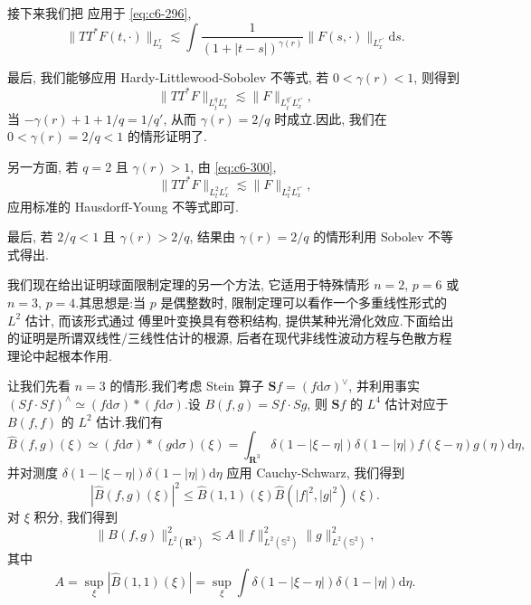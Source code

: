 接下来我们把 应用于 \eqref{eq:c6-296},
\begin{equation}
\|TT^* F(t, \cdot)\|_{L^r_x} \lesssim \int \frac{1}{(1 + |t-s|)^{\gamma(r)}} \|F(s, \cdot)\|_{L^{r'}_x} \mathrm{d}s.\label{eq:c6-300}
\end{equation}

最后, 我们能够应用 Hardy-Littlewood-Sobolev 不等式, 若 $0 < \gamma(r) < 1$, 则得到
\[
\|TT^* F\|_{L^q_t L^r_x} \lesssim \|F\|_{L^{q'}_t L^{r'}_x},
\]
当 $-\gamma(r) + 1 + 1/q = 1/q'$, 从而 $\gamma(r) = 2/q$ 时成立.因此, 我们在 $0 < \gamma(r) = 2/q < 1$ 的情形证明了.

另一方面, 若 $q = 2$ 且 $\gamma(r) > 1$, 由 \eqref{eq:c6-300},
\[
\|TT^* F\|_{L^2_t L^r_x} \lesssim \|F\|_{L^2_t L^{r'}_x},
\]
应用标准的 Hausdorff-Young 不等式即可.

最后, 若 $2/q < 1$ 且 $\gamma(r) > 2/q$, 结果由 $\gamma(r) = 2/q$ 的情形利用 Sobolev 不等式得出.


我们现在给出证明球面限制定理的另一个方法, 它适用于特殊情形 $n = 2$, $p = 6$ 或 $n = 3$, $p = 4$.其思想是:当 $p$ 是偶整数时, 限制定理可以看作一个多重线性形式的 $L^2$ 估计, 而该形式通过 傅里叶变换具有卷积结构, 提供某种光滑化效应.下面给出的证明是所谓双线性/三线性估计的根源, 后者在现代非线性波动方程与色散方程理论中起根本作用.

让我们先看 $n = 3$ 的情形.我们考虑 Stein 算子 $\boldsymbol{S} f = (f \mathrm{d}\sigma)^\vee$, 并利用事实 $(Sf \cdot Sf)^\wedge \simeq (f \mathrm{d}\sigma) * (f \mathrm{d}\sigma)$.设 $B(f, g) = Sf \cdot Sg$, 则 $\boldsymbol{S} f$ 的 $L^4$ 估计对应于 $B(f, f)$ 的 $L^2$ 估计.我们有
\[
\hat{B}(f, g)(\xi) \simeq (f \mathrm{d}\sigma) * (g \mathrm{d}\sigma)(\xi) = \int_{\mathbf{R}^3} \delta(1 - |\xi - \eta|) \delta(1 - |\eta|) f(\xi - \eta) g(\eta) \mathrm{d}\eta,
\]
并对测度 $\delta(1 - |\xi - \eta|) \delta(1 - |\eta|) \mathrm{d}\eta$ 应用 Cauchy-Schwarz, 我们得到
\[
|\hat{B}(f, g)(\xi)|^2 \leq \hat{B}(1, 1)(\xi) \hat{B}(|f|^2, |g|^2)(\xi).
\]
对 $\xi$ 积分, 我们得到
\begin{equation}
\|B(f, g)\|^2_{L^2(\mathbf{R}^3)} \lesssim A \|f\|^2_{L^2(\mathbb{S}^2)} \|g\|^2_{L^2(\mathbb{S}^2)}, \label{eq:c6-301}
\end{equation}
其中
\begin{equation}
A = \sup_\xi |\hat{B}(1, 1)(\xi)| = \sup_\xi \int \delta(1 - |\xi - \eta|) \delta(1 - |\eta|) \mathrm{d}\eta.\label{eq:c6-302}
\end{equation}

